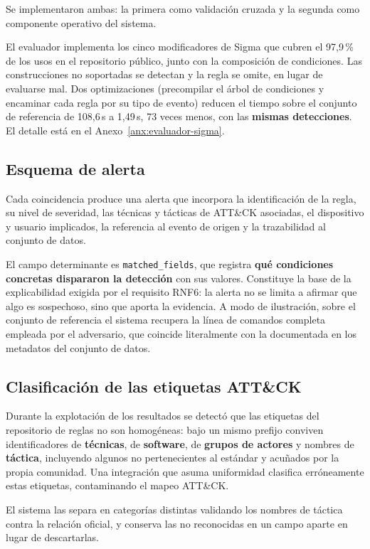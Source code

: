 Se implementaron ambas: la primera como validación cruzada y la segunda como componente
operativo del sistema.

El evaluador implementa los cinco modificadores de Sigma que cubren el 97,9\,\% de los usos
en el repositorio público, junto con la composición de condiciones. Las construcciones no
soportadas se detectan y la regla se omite, en lugar de evaluarse mal. Dos optimizaciones
(precompilar el árbol de condiciones y encaminar cada regla por su tipo de evento) reducen el
tiempo sobre el conjunto de referencia de 108,6\,s a 1,49\,s, 73 veces menos, con las
\textbf{mismas detecciones}. El detalle está en el Anexo~\ref{anx:evaluador-sigma}.

\subsection{Esquema de alerta}

Cada coincidencia produce una alerta que incorpora la identificación de la regla, su nivel de
severidad, las técnicas y tácticas de ATT\&CK asociadas, el dispositivo y usuario implicados,
la referencia al evento de origen y la trazabilidad al conjunto de datos.

El campo determinante es \texttt{matched\_fields}, que registra \textbf{qué condiciones
concretas dispararon la detección} con sus valores. Constituye la base de la explicabilidad
exigida por el requisito RNF6: la alerta no se limita a afirmar que algo es sospechoso, sino
que aporta la evidencia. A modo de ilustración, sobre el conjunto de referencia el sistema
recupera la línea de comandos completa empleada por el adversario, que coincide literalmente
con la documentada en los metadatos del conjunto de datos.

\subsection{Clasificación de las etiquetas ATT\&CK}

Durante la explotación de los resultados se detectó que las etiquetas del repositorio de
reglas no son homogéneas: bajo un mismo prefijo conviven identificadores de \textbf{técnicas},
de \textbf{software}, de \textbf{grupos de actores} y nombres de \textbf{táctica}, incluyendo
algunos no pertenecientes al estándar y acuñados por la propia comunidad. Una integración que
asuma uniformidad clasifica erróneamente estas etiquetas, contaminando el mapeo ATT\&CK.

El sistema las separa en categorías distintas validando los nombres de táctica contra la
relación oficial, y conserva las no reconocidas en un campo aparte en lugar de descartarlas.

